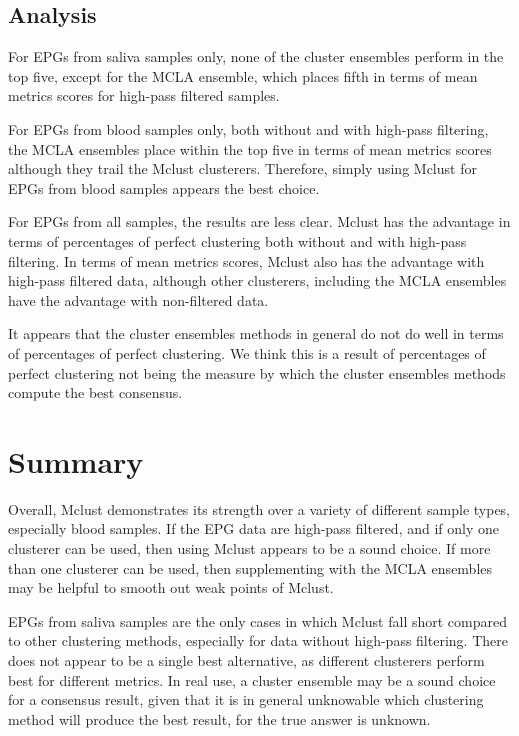 \FloatBarrier
\subsection{Analysis}

For EPGs from saliva samples only, none of the cluster ensembles perform in the top five, except for the MCLA ensemble, which places fifth in terms of mean metrics scores for high-pass filtered samples.

For EPGs from blood samples only, both without and with high-pass filtering, the MCLA ensembles place within the top five in terms of mean metrics scores although they trail the Mclust clusterers. Therefore, simply using Mclust for EPGs from blood samples appears the best choice.

For EPGs from all samples, the results are less clear. Mclust has the advantage in terms of percentages of perfect clustering both without and with high-pass filtering. In terms of mean metrics scores, Mclust also has the advantage with high-pass filtered data, although other clusterers, including the MCLA ensembles have the advantage with non-filtered data.

It appears that the cluster ensembles methods in general do not do well in terms of percentages of perfect clustering. We think this is a result of percentages of perfect clustering not being the measure by which the cluster ensembles methods compute the best consensus.

\section{Summary}

Overall, Mclust demonstrates its strength over a variety of different sample types, especially blood samples. If the EPG data are high-pass filtered, and if only one clusterer can be used, then using Mclust appears to be a sound choice. If more than one clusterer can be used, then supplementing with the MCLA ensembles may be helpful to smooth out weak points of Mclust.

EPGs from saliva samples are the only cases in which Mclust fall short compared to other clustering methods, especially for data without high-pass filtering. There does not appear to be a single best alternative, as different clusterers perform best for different metrics. In real use, a cluster ensemble may be a sound choice for a consensus result, given that it is in general unknowable which clustering method will produce the best result, for the true answer is unknown.
